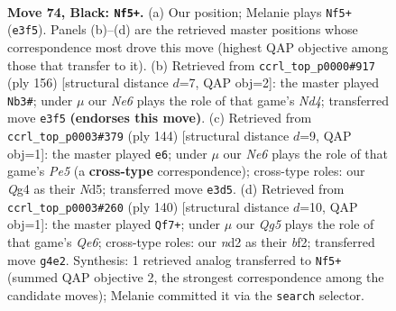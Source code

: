\documentclass[11pt]{article}
\begin{document}
\clearpage

\begin{figure}[p]\centering
\begin{subfigure}{0.46\textwidth}\centering
\resizebox{\linewidth}{!}{%
\newchessgame
\chessboard[
  setfen={1k6/8/7K/8/6q1/4n3/3N4/8 b - - 3 74},
  showmover=false,
  pgfstyle=straightmove, color=movearrow, markmove={e3-f5}
]}
\caption{}
\end{subfigure}\hfill
\begin{subfigure}{0.46\textwidth}\centering
\resizebox{\linewidth}{!}{%
\newchessgame
\chessboard[
  setfen={8/8/8/8/3N4/4K3/2Q5/k7 w - - 11 79},
  showmover=false,
  pgfstyle=straightmove, color=movearrow, markmove={d4-b3}
]}
\caption{}
\end{subfigure}
\\[4pt]
\begin{subfigure}{0.46\textwidth}\centering
\resizebox{\linewidth}{!}{%
\newchessgame
\chessboard[
  setfen={3k4/8/8/1n1NP3/8/8/8/7K w - - 0 73},
  showmover=false,
  pgfstyle=straightmove, color=movearrow, markmove={e5-e6}
]}
\caption{}
\end{subfigure}\hfill
\begin{subfigure}{0.46\textwidth}\centering
\resizebox{\linewidth}{!}{%
\newchessgame
\chessboard[
  setfen={8/8/4Q3/8/5k2/3K4/5b2/8 w - - 9 71},
  showmover=false,
  pgfstyle=straightmove, color=movearrow, markmove={e6-f7}
]}
\caption{}
\end{subfigure}
\caption{\textbf{Move 74, Black: \texttt{Nf5+}.} (a) Our position; Melanie plays \texttt{Nf5+} (\texttt{e3f5}). Panels (b)--(d) are the retrieved master positions whose correspondence most drove this move (highest QAP objective among those that transfer to it). (b) Retrieved from \texttt{ccrl\_top\_p0000\#917} (ply 156) [structural distance $d$=7, QAP obj=2]: the master played \texttt{Nb3\#}; under $\mu$ our \emph{Ne6} plays the role of that game's \emph{Nd4}; transferred move \texttt{e3f5} \textbf{(endorses this move)}. (c) Retrieved from \texttt{ccrl\_top\_p0003\#379} (ply 144) [structural distance $d$=9, QAP obj=1]: the master played \texttt{e6}; under $\mu$ our \emph{Ne6} plays the role of that game's \emph{Pe5} (a \textbf{cross-type} correspondence); cross-type roles: our \emph{Q}g4 as their \emph{N}d5; transferred move \texttt{e3d5}. (d) Retrieved from \texttt{ccrl\_top\_p0003\#260} (ply 140) [structural distance $d$=10, QAP obj=1]: the master played \texttt{Qf7+}; under $\mu$ our \emph{Qg5} plays the role of that game's \emph{Qe6}; cross-type roles: our \emph{n}d2 as their \emph{b}f2; transferred move \texttt{g4e2}. Synthesis: 1 retrieved analog transferred to \texttt{Nf5+} (summed QAP objective 2, the strongest correspondence among the candidate moves); Melanie committed it via the \texttt{search} selector.}
\label{fig:thought-m147}
\end{figure}
\end{document}
